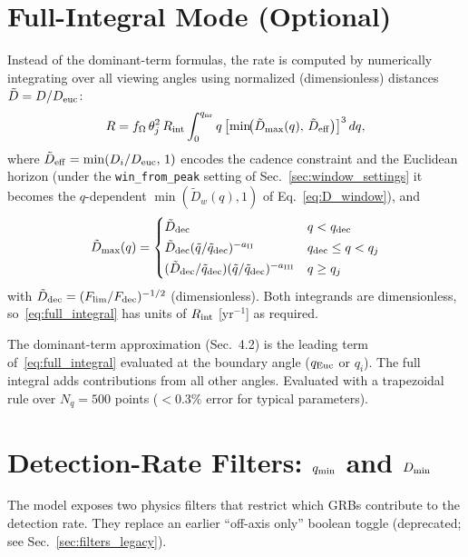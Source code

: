\documentclass[11pt,a4paper]{article}
\begin{document}
\section{Full-Integral Mode (Optional)}

Instead of the dominant-term formulas, the rate is computed by numerically integrating over all viewing angles using normalized (dimensionless) distances $\tilde{D}=D/D_{\rm euc}$:
\begin{equation}
\label{eq:full_integral}
R = f_\Omega\,\theta_j^2\,R_{\rm int}\int_0^{q_{\rm nr}} q\,\bigl[\min\!\bigl(\tilde{D}_{\rm max}(q),\,\tilde{D}_{\rm eff}\bigr)\bigr]^3\,dq,
\end{equation}
where $\tilde{D}_{\rm eff}=\min(D_i/D_{\rm euc},\,1)$ encodes the cadence constraint and the Euclidean horizon (under the \texttt{win\_from\_peak} setting of Sec.~\ref{sec:window_settings} it becomes the $q$-dependent $\min(\tilde D_w(q),1)$ of Eq.~\eqref{eq:D_window}), and
\begin{equation}
\label{eq:Dmax_tilde}
\tilde{D}_{\rm max}(q) = \begin{cases}
\tilde{D}_{\rm dec} & q<q_{\rm dec}\\[2pt]
\tilde{D}_{\rm dec}(\tilde{q}/\tilde{q}_{\rm dec})^{-a_{\rm II}} & q_{\rm dec}\le q<q_j\\[2pt]
(\tilde{D}_{\rm dec}/\tilde{q}_{\rm dec})(\tilde{q}/\tilde{q}_{\rm dec})^{-a_{\rm III}} & q\ge q_j
\end{cases}
\end{equation}
with $\tilde{D}_{\rm dec}=(F_{\rm lim}/F_{\rm dec})^{-1/2}$ (dimensionless). Both integrands are dimensionless, so~\eqref{eq:full_integral} has units of $R_{\rm int}$ [yr$^{-1}$] as required.

The dominant-term approximation (Sec.~4.2) is the leading term of~\eqref{eq:full_integral} evaluated at the boundary angle ($q_{\rm Euc}$ or $q_i$). The full integral adds contributions from all other angles.
Evaluated with a trapezoidal rule over $N_q=500$ points ($<0.3\%$ error for typical parameters).

\section{Detection-Rate Filters: $q_{\rm min}$ and $D_{\rm min}$}
\label{sec:filters}

The model exposes two physics filters that restrict which GRBs contribute to the detection rate.
They replace an earlier ``off-axis only'' boolean toggle (deprecated; see Sec.~\ref{sec:filters_legacy}).
\end{document}
